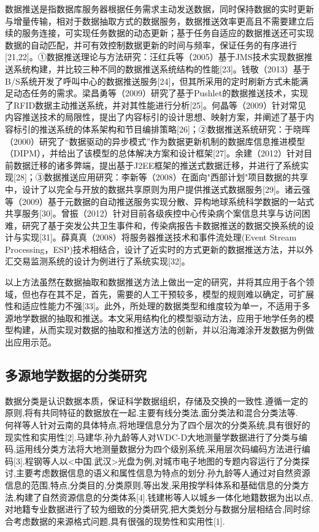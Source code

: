 \documentclass[master]{njnuthesis}
\begin{document}
数据推送是指数据库服务器根据任务需求主动发送数据，同时保持数据的实时更新与增量传输，相对于数据抽取方式的数据服务，数据推送效率更高且不需要建立后续的服务连接，可实现任务数据的动态更新；基于任务自适应的数据推送还可实现数据的自动匹配，并可有效控制数据更新的时间与频率，保证任务的有序进行[21,22]。①数据推送理论与方法研究：汪红兵等（2005）基于JMS技术实现数据推送系统构建，并比较三种不同的数据推送系统结构的性能[23]。钱敬（2013）基于B/S系统开发了呼叫中心的数据推送服务[24]，但其所采用的定时刷新方式未能满足动态任务的需求。梁昌勇等（2009）研究了基于Pushlet的数据推送技术，实现了RFID数据主动推送系统，并对其性能进行分析[25]。何晶等（2009）针对常见内容推送技术的局限性，提出了内容标引的设计思想、映射方案，并阐述了基于内容标引的推送系统的体系架构和节目编排策略[26]；②数据推送系统研究：于晓晖（2000）研究了“数据驱动的异步模式”作为数据更新机制的数据库信息推进模型（DIPM），并给出了该模型的总体解决方案和设计框架[27]。余建（2012）针对目前数据迁移的诸多弊端，提出基于J2EE框架的推送式数据迁移，并进行了系统实现[28]；③数据推送应用研究：李新等（2008）在面向"西部计划"项目数据的共享中，设计了以完全与开放的数据共享原则为用户提供推送式数据服务[29]。诸云强等（2009）基于元数据的自动推送服务实现分散、异构地球系统科学数据的一站式共享服务[30]。曾振（2012）针对目前各级疾控中心传染病个案信息共享与访问困难，研究了基于突发公共卫生事件和，传染病报告卡数据推送的数据交换系统的设计与实现[31]。薛真真（2008）将服务器推送技术和事件流处理(Event Stream Processing，ESP)技术相结合，设计了近实时的方式更新的数据推送方法，并以外汇交易监测系统的设计为例进行了系统实现[32]。

以上方法虽然在数据抽取和数据推送方法上做出一定的研究，并将其应用于各个领域，但也存在其不足，首先，需要的人工干预较多，模型的规则难以确定，可扩展性和适应性能力不强[33]。此外，所处理的数据类型和维度较为单一，不适用于多源地学数据的抽取和推送。本文采用结构化的模型驱动方法，应用于地学任务的模型构建，从而实现对数据的抽取和推送方法的创新，并以沿海滩涂开发数据为例做出应用示范。

\subsection{多源地学数据的分类研究}
数据分类是认识数据本质，保证科学数据组织，存储及交换的一致性.遵循一定的原则,将有共同特征的数据放在一起.主要有线分类法,面分类法和混合分类法等.　何祥等人针对云南的具体特点,将地理信息分为了四个层次的分类系统,具有很好的现实性和实用性[2].马建华,孙九龄等人对WDC-D大地测量学数据进行了分类与编码,运用线分类方法将大地测量数据分为四个级别系统,采用层次码编码方法进行编码[3].程钢等人以<中国.武汉>光盘为例,对城市电子地图的专题内容运行了分类探讨,主要考虑数据信息的语义和属性信息为特点的划分.孙九龄等人通过对自然资源信息的范围,特点,分类目的,分类原则,等出发,采用按学科体系和基础信息的分类方法,构建了自然资源信息的分类体系[4].钱建彬等人以城乡一体化地籍数据为出以点,对地籍专业数据进行了较为细致的分类研究,把大类划分与数据分层相结合,同时综合考虑数据的来源格式问题,具有很强的现势性和实用性[1].
\end{document}
